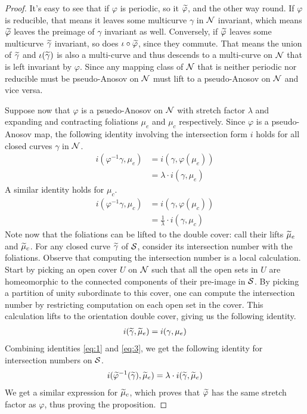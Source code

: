 \begin{proof}
  It's easy to see that if $\varphi$ is periodic, so it $\widetilde{\varphi}$, and the other way round. If $\varphi$
  is reducible, that means it leaves some multicurve $\gamma$ in $\mathcal{N}$ invariant, which means $\widetilde{\varphi}$ leaves
  the preimage of $\gamma$ invariant as well. Conversely, if $\widetilde{\varphi}$ leaves some multicurve
  $\widetilde{\gamma}$ invariant, so does $\iota \circ \widetilde{\varphi}$, since they commute. That means the union of $\widetilde{\gamma}$
  and $\iota(\widetilde{\gamma})$ is also a multi-curve and thus descends to a multi-curve on $\mathcal{N}$ that is left invariant
  by $\varphi$. Since any mapping class of $\mathcal{N}$ that is neither periodic nor reducible must be pseudo-Anosov on $\mathcal{N}$ must lift to a pseudo-Anosov on $\mathcal{N}$
  and vice versa.

  Suppose now that $\varphi$ is a psuedo-Anosov on $\mathcal{N}$ with stretch factor $\lambda$ and expanding and contracting
  foliations $\mu_e$ and $\mu_c$ respectively. Since $\varphi$ is a pseudo-Anosov map, the following
  identity involving the intersection form $i$ holds for all closed curves $\gamma$ in $\mathcal{N}$.
  \begin{align}
    \label{eq:1}
    i(\varphi^{-1}\gamma, \mu_e) &= i(\gamma, \varphi(\mu_e)) \\
                               &= \lambda \cdot i(\gamma, \mu_e)
  \end{align}
  A similar identity holds for $\mu_c$.
  \begin{align}
    \label{eq:2}
    i(\varphi^{-1}\gamma, \mu_c) &= i(\gamma, \varphi(\mu_c)) \\
                               &= \frac{1}{\lambda} \cdot i(\gamma, \mu_c)
  \end{align}
  Note now that the foliations can be lifted to the double cover: call their lifts $\widetilde{\mu}_e$ and
  $\widetilde{\mu}_c$. For any closed curve $\widetilde{\gamma}$ of $\mathcal{S}$, consider its intersection number with the
  foliations. Observe that computing the intersection number is a local calculation. Start by picking an open
  cover $U$ on $\mathcal{N}$ such that all the open sets in $U$ are homeomorphic to the connected components of their
  pre-image in $\mathcal{S}$. By picking a partition of unity subordinate to this cover, one can compute the intersection
  number by restricting computation on each open set in the cover. This calculation lifts to the orientation double
  cover, giving us the following identity.
  \begin{align}
    \label{eq:3}
    i(\widetilde{\gamma}, \widetilde{\mu}_e) = i(\gamma, \mu_e)
  \end{align}
  Combining identities \eqref{eq:1} and \eqref{eq:3}, we get the following identity for intersection numbers
  on $\mathcal{S}$.
  \begin{align*}
    i(\widetilde{\varphi}^{-1} (\widetilde{\gamma}), \widetilde{\mu}_e) = \lambda \cdot i(\widetilde{\gamma}, \widetilde{\mu}_e)
  \end{align*}
  We get a similar expression for $\widetilde{\mu}_c$, which proves that $\widetilde{\varphi}$ has the same stretch factor
  as $\varphi$, thus proving the proposition.
\end{proof}
